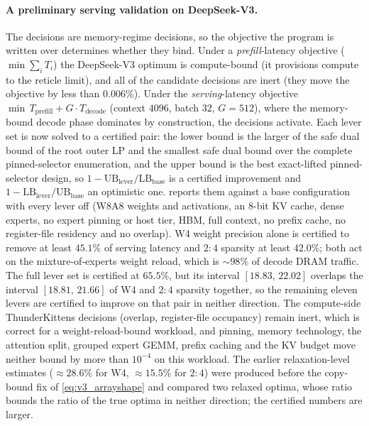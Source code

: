 \paragraph{A preliminary serving validation on DeepSeek-V3.}
The decisions are memory-regime decisions, so the objective the program is written over
determines whether they bind. Under a \emph{prefill}-latency objective ($\min\sum_i
T_i$) the DeepSeek-V3 optimum is compute-bound (it provisions compute to the reticle
limit), and all of the candidate decisions are inert (they move the objective by less
than $0.006\%$). Under the \emph{serving}-latency objective
$\min\,T_{\mathrm{prefill}}+G\cdot T_{\mathrm{decode}}$ (context $4096$, batch $32$,
$G=512$), where the memory-bound decode phase dominates by construction, the decisions
activate. Each lever set is now solved to a certified pair: the lower bound is
the larger of the safe dual bound of the root outer LP and the smallest safe
dual bound over the complete pinned-selector enumeration, and the upper bound is
the best exact-lifted pinned-selector design, so
$1-\mathrm{UB}_{\mathrm{lever}}/\mathrm{LB}_{\mathrm{base}}$ is a certified
improvement and $1-\mathrm{LB}_{\mathrm{lever}}/\mathrm{UB}_{\mathrm{base}}$
an optimistic one.  reports them against a base
configuration with every lever off (W8A8 weights and activations, an 8-bit KV
cache, dense experts, no expert pinning or host tier, HBM, full context, no
prefix cache, no register-file residency and no overlap). W4 weight precision
alone is certified to remove at least $45.1\%$ of serving latency and $2{:}4$
sparsity at least $42.0\%$; both act on the mixture-of-experts weight reload,
which is ${\sim}98\%$ of decode DRAM traffic. The full lever set is certified at
$65.5\%$, but its interval $[18.83,\,22.02]$ overlaps the interval
$[18.81,\,21.66]$ of W4 and $2{:}4$ sparsity together, so the remaining eleven
levers are certified to improve on that pair in neither direction. The
compute-side ThunderKittens decisions (overlap, register-file occupancy) remain
inert, which is correct for a weight-reload-bound workload, and pinning, memory
technology, the attention split, grouped expert GEMM, prefix caching and the KV
budget move neither bound by more than $10^{-4}$ on this workload. The earlier
relaxation-level estimates (${\approx}28.6\%$ for W4, ${\approx}15.5\%$ for
$2{:}4$) were produced before the copy-bound fix of \eqref{eq:v3_arrayshape} and
compared two relaxed optima, whose ratio bounds the ratio of the true optima in
neither direction; the certified numbers are larger.


